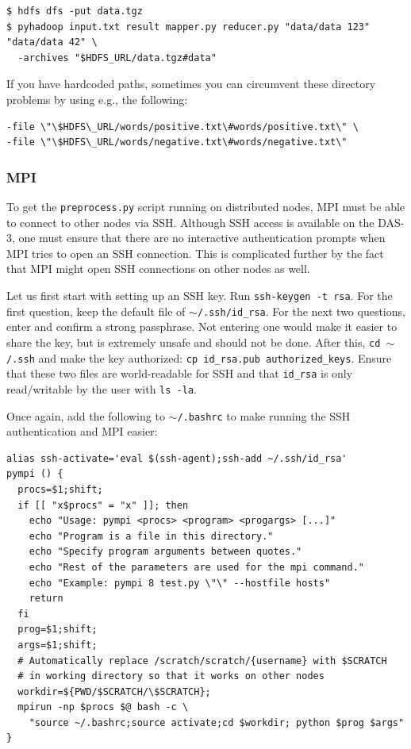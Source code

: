 \documentclass{article}
\begin{document}
\begin{verbatim}
$ hdfs dfs -put data.tgz
$ pyhadoop input.txt result mapper.py reducer.py "data/data 123" "data/data 42" \
  -archives "$HDFS_URL/data.tgz#data"
\end{verbatim}

If you have hardcoded paths, sometimes you can circumvent these directory 
problems by using e.g., the following:
\begin{verbatim}
-file \"\$HDFS\_URL/words/positive.txt\#words/positive.txt\" \
-file \"\$HDFS\_URL/words/negative.txt\#words/negative.txt\"
\end{verbatim}

\subsubsection{MPI}\label{app:mpi}
To get the \texttt{preprocess.py} script running on distributed nodes, MPI must 
be able to connect to other nodes via SSH\@. Although SSH access is available on
the DAS-3, one must ensure that there are no interactive authentication prompts
when MPI tries to open an SSH connection. This is complicated further by the fact
that MPI might open SSH connections on other nodes as well.

Let us first start with setting up an SSH key. Run \texttt{ssh-keygen -t rsa}. 
For the first question, keep the default file of \texttt{$\sim$/.ssh/id\_rsa}. 
For the next two questions, enter and confirm a strong passphrase. Not entering 
one would make it easier to share the key, but is extremely unsafe and should 
not be done. After this, \texttt{cd $\sim$/.ssh} and make the key authorized: 
\texttt{cp id\_rsa.pub authorized\_keys}. Ensure that these two files are 
world-readable for SSH and that \texttt{id\_rsa} is only read/writable by the 
user with \texttt{ls -la}.

Once again, add the following to \texttt{$\sim$/.bashrc} to make running the 
SSH authentication and MPI easier:

\begin{verbatim}
alias ssh-activate='eval $(ssh-agent);ssh-add ~/.ssh/id_rsa'
pympi () {
  procs=$1;shift;
  if [[ "x$procs" = "x" ]]; then
    echo "Usage: pympi <procs> <program> <progargs> [...]"
    echo "Program is a file in this directory."
    echo "Specify program arguments between quotes."
    echo "Rest of the parameters are used for the mpi command."
    echo "Example: pympi 8 test.py \"\" --hostfile hosts"
    return
  fi
  prog=$1;shift;
  args=$1;shift;
  # Automatically replace /scratch/scratch/{username} with $SCRATCH
  # in working directory so that it works on other nodes
  workdir=${PWD/$SCRATCH/\$SCRATCH};
  mpirun -np $procs $@ bash -c \
    "source ~/.bashrc;source activate;cd $workdir; python $prog $args"
}
\end{verbatim}
\end{document}
